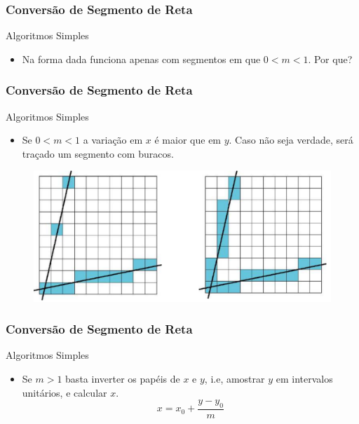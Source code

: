 \documentclass{beamer}
\begin{document}
\begin{frame}
\frametitle{Conversão de Segmento de Reta}

		\begin{block}{Algoritmos Simples}
		\begin{itemize}
			\item Na forma dada funciona apenas com segmentos em que $ 0 < m < 1$. Por que?
		\end{itemize}
	\end{block}
	
\end{frame}


\begin{frame}
\frametitle{Conversão de Segmento de Reta}

		\begin{block}{Algoritmos Simples}
		\begin{itemize}
			\item Se $0 < m < 1$ a variação em $x$ é maior que em $y$. Caso não seja verdade, será traçado um segmento com buracos.
		\end{itemize}
	\end{block}
	
	\begin{figure}[!h]
			\begin{center}
			\includegraphics[width=1\textwidth]{Figures/Ret}
			\end{center}
		\end{figure}
	
\end{frame}

\begin{frame}
\frametitle{Conversão de Segmento de Reta}

		\begin{block}{Algoritmos Simples}
		\begin{itemize}
			\item Se $m > 1$ basta inverter os papéis de $x$ e $y$, i.e, amostrar $y$ em intervalos unitários, e calcular $x$.
			\begin{equation*}
				x = x_0 + \frac{y-y_0}{m}
			\end{equation*}
		\end{itemize}
	\end{block}
	
\end{frame}
\end{document}
